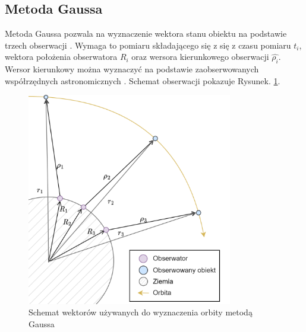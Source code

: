 \subsection{Metoda Gaussa}
Metoda Gaussa pozwala na wyznaczenie wektora stanu obiektu na podstawie trzech obserwacji \cite{Curtis2013}. Wymaga to pomiaru składającego się z się z czasu pomiaru $t_i$, wektora położenia obserwatora $R_i$ oraz wersora kierunkowego obserwacji $\hat{\rho_i}$. Wersor kierunkowy można wyznaczyć na podstawie zaobserwowanych współrzędnych astronomicznych  \cite{Astronomiczne}. Schemat obserwacji pokazuje Rysunek. \ref{fig:obserwacja}.

    \begin{figure}[h]
    \centering
    \includegraphics[width=0.8\textwidth]{tex/img/ziemia-orbita.png}
    \caption{Schemat wektorów używanych do wyznaczenia orbity metodą Gaussa}
    \label{fig:obserwacja}
    \end{figure}


